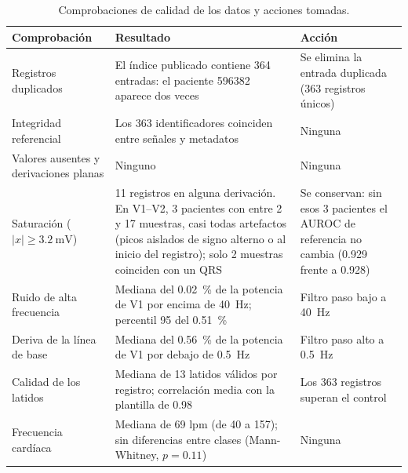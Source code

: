 \begin{table}[H]
\centering
\caption[Comprobaciones de calidad de los datos]{Comprobaciones de calidad de los datos y acciones tomadas.}
\label{tab:calidad}
\small
\begin{tabularx}{\linewidth}{@{}p{3.3cm}Lp{3.9cm}@{}}
\toprule
\textbf{Comprobación} & \textbf{Resultado} & \textbf{Acción} \\
\midrule
Registros duplicados & El índice  publicado contiene 364 entradas: el paciente 596382 aparece dos veces & Se elimina la entrada duplicada (363 registros únicos) \\
Integridad referencial & Los 363 identificadores coinciden entre señales y metadatos & Ninguna \\
Valores ausentes y derivaciones planas & Ninguno & Ninguna \\
Saturación ($|x| \geq \SI{3.2}{\milli\volt}$) & 11 registros en alguna derivación. En V1--V2, 3 pacientes con entre 2 y 17 muestras, casi todas artefactos (picos aislados de signo alterno o al inicio del registro); solo 2 muestras coinciden con un QRS & Se conservan: sin esos 3 pacientes el AUROC de referencia no cambia (\num{0.929} frente a \num{0.928}) \\
Ruido de alta frecuencia & Mediana del \SI{0.02}{\percent} de la potencia de V1 por encima de \SI{40}{\hertz}; percentil 95 del \SI{0.51}{\percent} & Filtro paso bajo a \SI{40}{\hertz} \\
Deriva de la línea de base & Mediana del \SI{0.56}{\percent} de la potencia de V1 por debajo de \SI{0.5}{\hertz} & Filtro paso alto a \SI{0.5}{\hertz} \\
Calidad de los latidos & Mediana de 13 latidos válidos por registro; correlación media con la plantilla de \num{0.98} & Los 363 registros superan el control \\
Frecuencia cardíaca & Mediana de 69 lpm (de 40 a 157); sin diferencias entre clases (Mann-Whitney, $p = \num{0.11}$) & Ninguna \\
\bottomrule
\end{tabularx}
\end{table}


